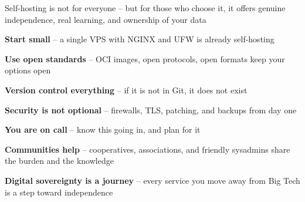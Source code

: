 \documentclass[Screen16to9,17pt]{foils}
\begin{document}



Self-hosting is not for everyone -- but for those who choose it,
it offers genuine independence, real learning, and ownership of your data


\begin{list2}
\item {\bf Start small} -- a single VPS with NGINX and UFW is already self-hosting
\item {\bf Use open standards} -- OCI images, open protocols, open formats keep your options open
\item {\bf Version control everything} -- if it is not in Git, it does not exist
\item {\bf Security is not optional} -- firewalls, TLS, patching, and backups from day one
\item {\bf You are on call} -- know this going in, and plan for it
\item {\bf Communities help} -- cooperatives, associations, and friendly sysadmins
share the burden and the knowledge
\item {\bf Digital sovereignty is a journey} -- every service you move away from Big Tech
is a step toward independence
\end{list2}


\myquestionspage
\end{document}
